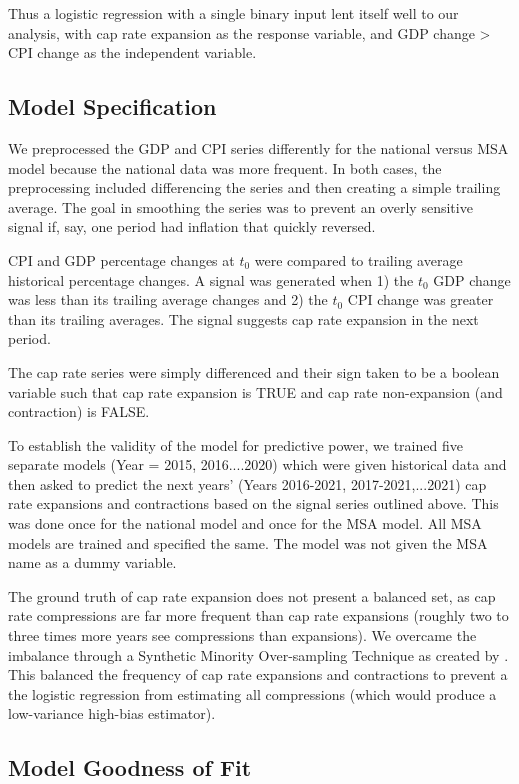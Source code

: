 Thus a logistic regression with a single binary input lent itself well to our analysis, with cap rate expansion as the response variable, and GDP change > CPI change as the independent variable. 

\subsection{Model Specification}

We preprocessed the GDP and CPI series differently for the national versus MSA model because the national data was more frequent. In both cases, the preprocessing included differencing the series and then creating a simple trailing average. The goal in smoothing the series was to prevent an overly sensitive signal if, say, one period had inflation that quickly reversed. 

CPI and GDP percentage changes at $t_0$ were compared to trailing average historical percentage changes. A  signal was generated when 1) the $t_0$ GDP change was less than its trailing average changes and 2) the $t_0$ CPI change was greater than its trailing averages. The signal suggests cap rate expansion in the next period. 

The cap rate series were simply differenced and their sign taken to be a boolean variable such that cap rate expansion is TRUE and cap rate non-expansion (and contraction) is FALSE.

To establish the validity of the model for predictive power, we trained five separate models (Year = 2015, 2016....2020) which were given historical data and then asked to predict the next years' (Years 2016-2021, 2017-2021,...2021) cap rate expansions and contractions based on the signal series outlined above. This was done once for the national model and once for the MSA model. All MSA models are trained and specified the same. The model was not given the MSA name as a dummy variable.  

The ground truth of cap rate expansion does not present a balanced set, as cap rate compressions are far more frequent than cap rate expansions (roughly two to three times more years see compressions than expansions). We overcame the imbalance through a Synthetic Minority Over-sampling Technique as created by \citep*{SMOTE}. This balanced the frequency of cap rate expansions and contractions to prevent a the logistic regression from estimating all compressions (which would produce a low-variance high-bias estimator).

\subsection{Model Goodness of Fit}

